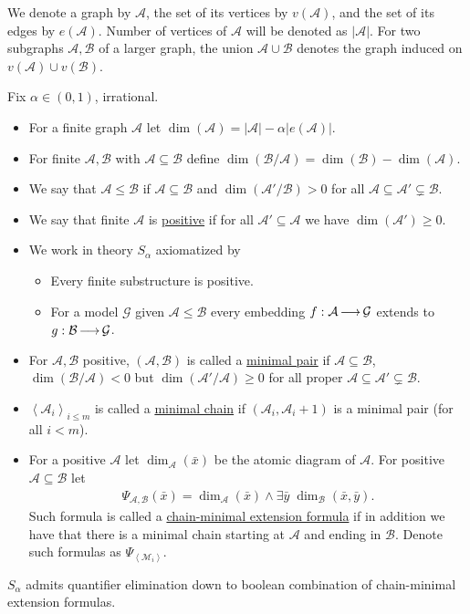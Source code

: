 \documentclass{amsart}
\newcommand{\GG}{\mathcal G}
\newcommand{\defn}{\underline}
\newcommand{\A}{\mathcal A}
\newcommand{\B}{\mathcal B}
\newcommand{\M}{\mathcal M}
\newcommand{\agl}[1]{\left\langle #1 \right\rangle}
\begin{document}
We denote a graph by $\A$, the set of its vertices by $v(\A)$, and the set of its edges by $e(\A)$.
Number of vertices of $\A$ will be denoted as $|\A|$.
For two subgraphs $\A, \B$ of a larger graph, the union $\A \cup \B$ denotes the graph induced on $v(\A) \cup v(\B)$.
\begin{Definition}
  Fix $\alpha \in (0,1)$, irrational.
  \begin{itemize}
  \item For a finite graph $\A$ let $\dim(\A) = |\A| - \alpha |e(\A)|$.
  \item For finite $\A,\B$ with $\A \subseteq \B$ define $\dim(\B/\A) = \dim(\B) - \dim(\A)$.
  \item We say that $\A \leq \B$ if $\A \subseteq \B$ and $\dim(\A'/\B) > 0$ for all $\A \subseteq \A' \subsetneq \B$.
  \item We say that finite $\A$ is \defn{positive} if for all $\A' \subseteq \A$ we have $\dim(\A') \geq 0$.
  \item We work in theory $S_\alpha$ axiomatized by
    \begin{itemize}
    \item Every finite substructure is positive.
    \item For a model $\GG$ given $\A \leq \B$ every embedding $f : \A \arr \GG$ extends to $g: \B \arr \GG$.
    \end{itemize}
  \item For $\A, \B$ positive, $(\A, \B)$ is called a \defn{minimal pair} if
    $\A \subseteq \B$, $\dim(\B/\A) < 0$ but $\dim(\A'/\A) \geq 0$ for all proper $\A \subseteq \A' \subsetneq \B$.
  \item $\agl{\A_i}_{i \leq m}$ is called a \defn{minimal chain} if $(\A_i, \A_i+1)$ is a minimal pair (for all $i < m$).
  \item For a positive $\A$ let $\dim_\A(\bar x)$ be the atomic diagram of $\A$. For positive $\A \subseteq \B$ let 
    \begin{align*}
      \Psi_{\A,\B}(\bar x) = \dim_\A(\bar x) \wedge \exists \bar y \; \dim_\B(\bar x, \bar y).
    \end{align*}
    Such formula is called a \defn{chain-minimal extension formula} if in addition we have that there is a minimal chain starting at 
    $\A$ and ending in $\B$.
    Denote such formulas as $\Psi_{\agl{\M_i}}$.
  \end{itemize}
\end{Definition}

\begin{Theorem} 
  $S_\alpha$ admits quantifier elimination down to boolean combination of chain-minimal extension formulas.
\end{Theorem}
\end{document}
